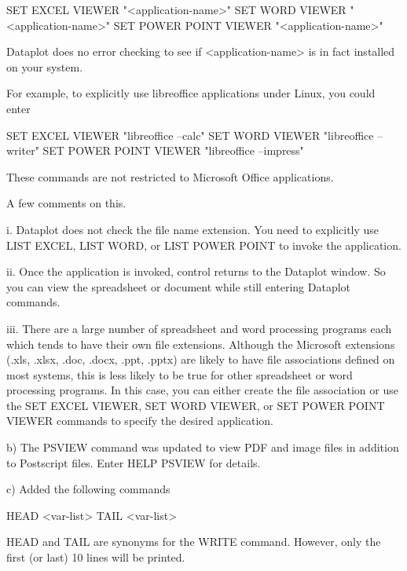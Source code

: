              SET EXCEL VIEWER        "<application-name>"
             SET WORD VIEWER         "<application-name>"
             SET POWER POINT VIEWER  "<application-name>"

       Dataplot does no error checking to see if <application-name>
       is in fact installed on your system.

       For example, to explicitly use libreoffice applications
       under Linux, you could enter

             SET EXCEL VIEWER       "libreoffice --calc"
             SET WORD  VIEWER       "libreoffice --writer"
             SET POWER POINT VIEWER "libreoffice --impress"

       These commands are not restricted to Microsoft Office
       applications.

       A few comments on this.

           i. Dataplot does not check the file name extension.
              You need to explicitly use LIST EXCEL, LIST WORD,
              or LIST POWER POINT to invoke the application.

          ii. Once the application is invoked, control returns
              to the Dataplot window.  So you can view the
              spreadsheet or document while still entering Dataplot
              commands.

         iii. There are a large number of spreadsheet and word
              processing programs each which tends to have their
              own file extensions.  Although the Microsoft extensions
              (.xls, .xlsx, .doc, .docx, .ppt, .pptx) are likely to
              have file associations defined on most systems, this is
              less likely to be true for other spreadsheet or word
              processing programs.  In this case, you can either
              create the file association or use the SET EXCEL VIEWER,
              SET WORD VIEWER, or SET POWER POINT VIEWER commands to
              specify the desired application.

    b) The PSVIEW command was updated to view PDF and image files
       in addition to Postscript files.  Enter HELP PSVIEW for
       details.

    c) Added the following commands

          HEAD <var-list>
          TAIL <var-list>

       HEAD and TAIL are synonyms for the WRITE command.  However, only
       the first (or last) 10 lines will be printed.

